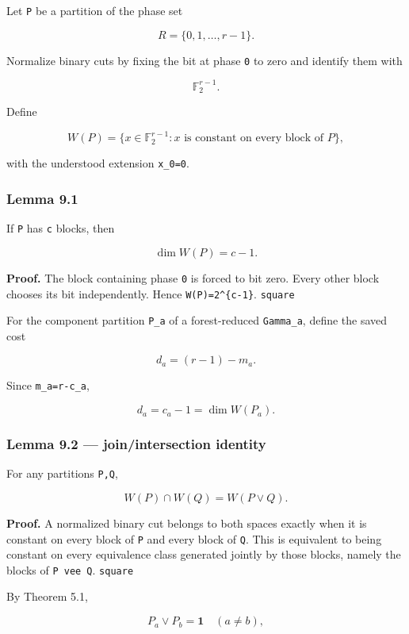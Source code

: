 Let \texttt{P} be a partition of the phase set

\[
R=\{0,1,\ldots,r-1\}.
\]

Normalize binary cuts by fixing the bit at phase \texttt{0} to zero and
identify them with

\[
\mathbb F_2^{r-1}.
\]

Define

\[
W(P)=\{x\in\mathbb F_2^{r-1}:x\text{ is constant on every block of }P\},
\tag{40}
\]

with the understood extension \texttt{x\_0=0}.

\hypertarget{lemma-9.1}{%
\subsubsection{Lemma 9.1}\label{lemma-9.1}}

If \texttt{P} has \texttt{c} blocks, then

\[
\dim W(P)=c-1.
\tag{41}
\]

\textbf{Proof.} The block containing phase \texttt{0} is forced to bit
zero. Every other block chooses its bit independently. Hence
\texttt{\textbar{}W(P)\textbar{}=2\^{}\{c-1\}}. \texttt{square}

For the component partition \texttt{P\_a} of a forest-reduced
\texttt{Gamma\_a}, define the saved cost

\[
d_a=(r-1)-m_a.
\tag{42}
\]

Since \texttt{m\_a=r-c\_a},

\[
d_a=c_a-1=\dim W(P_a).
\tag{43}
\]

\hypertarget{lemma-9.2-joinintersection-identity}{%
\subsubsection{Lemma 9.2 --- join/intersection
identity}\label{lemma-9.2-joinintersection-identity}}

For any partitions \texttt{P,Q},

\[
\boxed{W(P)\cap W(Q)=W(P\vee Q).}
\tag{44}
\]

\textbf{Proof.} A normalized binary cut belongs to both spaces exactly
when it is constant on every block of \texttt{P} and every block of
\texttt{Q}. This is equivalent to being constant on every equivalence
class generated jointly by those blocks, namely the blocks of
\texttt{P\ vee\ Q}. \texttt{square}

By Theorem 5.1,

\[
P_a\vee P_b=\mathbf 1
\quad(a\ne b),
\]

